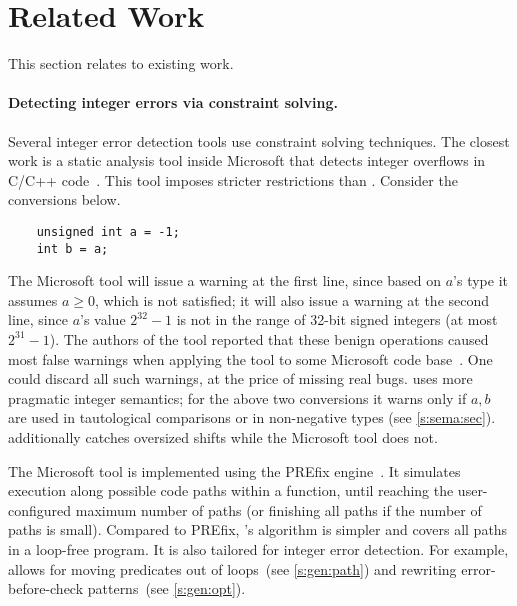 \section{Related Work}
\label{s:relwk}

This section relates \sys to existing work.  

\paragraph{Detecting integer errors via constraint solving.}

Several integer error detection tools use constraint solving
techniques.  The closest work is a static analysis tool inside
Microsoft that detects integer overflows in C/C++ code~\cite{moy:z3prefix}.
This tool imposes stricter restrictions than \sys.
Consider the conversions below.
\begin{Verbatim}
	unsigned int a = -1;
	int b = a;
\end{Verbatim}
The Microsoft tool will issue a warning at the first line,
since based on $a$'s type it assumes $a \geq 0$, which is not satisfied;
it will also issue a warning at the second line,
since $a$'s value $2^{32} - 1$ is not in the range of 32-bit signed integers
(at most $2^{31} - 1$).
The authors of the tool reported that these benign operations caused
most false warnings when applying the tool to some Microsoft code
base~\cite[\subsectionautorefname~6.2]{moy:z3prefix}.
One could discard all such warnings, at the price of
missing real bugs.
\sys uses more pragmatic integer semantics;
for the above two conversions it warns only if $a, b$ are used in
tautological comparisons or in non-negative types (see \autoref{s:sema:sec}).
\sys additionally catches oversized shifts while the Microsoft tool does not.

The Microsoft tool is implemented using the PREfix
engine~\cite{bush:prefix}.  It simulates execution along possible
code paths within a function, until reaching
the user-configured maximum number of paths (or finishing all paths
if the number of paths is small).
%
Compared to PREfix, \sys's algorithm is simpler
and covers all paths in a loop-free program.
It is also tailored for integer error detection.  For example, \sys
allows for moving predicates out of loops~(see \autoref{s:gen:path})
and rewriting error-before-check patterns~(see \autoref{s:gen:opt}).

